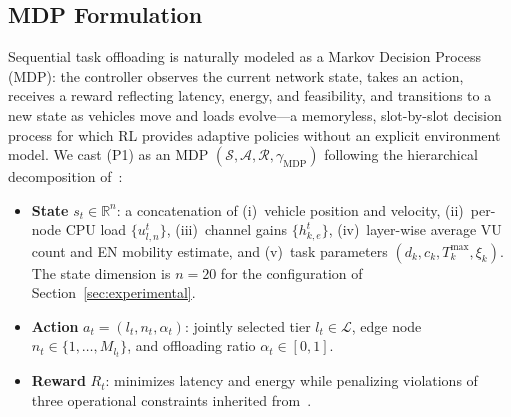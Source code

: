 \documentclass[11pt,a4paper]{article}
\theoremstyle{definition}
\begin{document}
\subsection{MDP Formulation}
\label{subsec:mdp}

Sequential task offloading is naturally modeled as a Markov Decision Process (MDP): the controller observes the current network state, takes an action, receives a reward reflecting latency, energy, and feasibility, and transitions to a new state as vehicles move and loads evolve---a memoryless, slot-by-slot decision process for which RL provides adaptive policies without an explicit environment model. We cast (P1) as an MDP $(\mathcal{S}, \mathcal{A}, \mathcal{R}, \gamma_{\mathrm{MDP}})$ following the hierarchical decomposition of~\cite{hrl_ntn}:
\begin{itemize}
  \item \textbf{State} $s_t \in \mathbb{R}^n$: a concatenation of (i)~vehicle position and velocity, (ii)~per-node CPU load $\{u_{l,n}^t\}$, (iii)~channel gains $\{h_{k,e}^t\}$, (iv)~layer-wise average VU count and EN mobility estimate, and (v)~task parameters $(d_k, c_k, T_k^{\max}, \xi_k)$. The state dimension is $n = 20$ for the configuration of Section~\ref{sec:experimental}.
  \item \textbf{Action} $a_t = (l_t, n_t, \alpha_t)$: jointly selected tier $l_t \in \mathcal{L}$, edge node $n_t \in \{1,\ldots,M_{l_t}\}$, and offloading ratio $\alpha_t \in [0,1]$.
  \item \textbf{Reward} $R_t$: minimizes latency and energy while penalizing violations of three operational constraints inherited from~\cite{hrl_ntn}.
\end{itemize}
\end{document}
